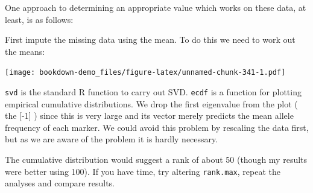 \documentclass[
]{book}
\newenvironment{Shaded}{\begin{snugshade}}{\end{snugshade}}
\newcommand{\AttributeTok}[1]{\textcolor[rgb]{0.77,0.63,0.00}{#1}}
\newcommand{\CommentTok}[1]{\textcolor[rgb]{0.56,0.35,0.01}{\textit{#1}}}
\newcommand{\ControlFlowTok}[1]{\textcolor[rgb]{0.13,0.29,0.53}{\textbf{#1}}}
\newcommand{\DecValTok}[1]{\textcolor[rgb]{0.00,0.00,0.81}{#1}}
\newcommand{\FloatTok}[1]{\textcolor[rgb]{0.00,0.00,0.81}{#1}}
\newcommand{\FunctionTok}[1]{\textcolor[rgb]{0.00,0.00,0.00}{#1}}
\newcommand{\NormalTok}[1]{#1}
\newcommand{\OtherTok}[1]{\textcolor[rgb]{0.56,0.35,0.01}{#1}}
\newcommand{\SpecialCharTok}[1]{\textcolor[rgb]{0.00,0.00,0.00}{#1}}
\begin{document}
One approach to determining an appropriate value which works on these data, at least, is as follows:

First impute the missing data using the mean. To do this we need to work out the means:

\begin{Shaded}
\end{Shaded}

\texttt{[image: bookdown-demo\_files/figure-latex/unnamed-chunk-341-1.pdf]}

\texttt{svd} is the standard R function to carry out SVD. \texttt{ecdf} is a function for plotting empirical cumulative distributions. We drop the first eigenvalue from the plot ( the {[}-1{]} ) since this is very large and its vector merely predicts the mean allele frequency of each marker. We could avoid this problem by rescaling the data first, but as we are aware of the problem it is hardly necessary.

The cumulative distribution would suggest a rank of about 50 (though my results were better using 100). If you have time, try altering \texttt{rank.max}, repeat the analyses and compare results.
\end{document}
